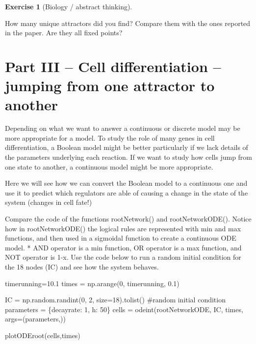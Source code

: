 \documentclass[
  letterpaper,
  DIV=11,
  numbers=noendperiod]{scrreprt}
\newenvironment{Shaded}{\begin{snugshade}}{\end{snugshade}}
\newcommand{\CommentTok}[1]{\textcolor[rgb]{0.37,0.37,0.37}{#1}}
\newcommand{\DecValTok}[1]{\textcolor[rgb]{0.68,0.00,0.00}{#1}}
\newcommand{\FloatTok}[1]{\textcolor[rgb]{0.68,0.00,0.00}{#1}}
\newcommand{\NormalTok}[1]{\textcolor[rgb]{0.00,0.23,0.31}{#1}}
\newcommand{\OperatorTok}[1]{\textcolor[rgb]{0.37,0.37,0.37}{#1}}
\newcommand{\StringTok}[1]{\textcolor[rgb]{0.13,0.47,0.30}{#1}}
\theoremstyle{definition}
\newtheorem{exercise}{Exercise}[chapter]
\theoremstyle{remark}
\begin{document}
\begin{exercise}[Biology / abstract
thinking]\protect\hypertarget{exr-non}{}\label{exr-non}

How many unique attractors did you find? Compare them with the ones
reported in the paper. Are they all fixed points?

\end{exercise}

\section{Part III -- Cell differentiation -- jumping from one attractor
to
another}\label{part-iii-cell-differentiation-jumping-from-one-attractor-to-another}

Depending on what we want to answer a continuous or discrete model may
be more appropriate for a model. To study the role of many genes in cell
differentiation, a Boolean model might be better particularly if we lack
details of the parameters underlying each reaction. If we want to study
how cells jump from one state to another, a continuous model might be
more appropriate.

Here we will see how we can convert the Boolean model to a continuous
one and use it to predict which regulators are able of causing a change
in the state of the system (changes in cell fate!)

Compare the code of the functions rootNetwork() and rootNetworkODE().
Notice how in rootNetworkODE() the logical rules are represented with
min and max functions, and then used in a sigmoidal function to create a
continuous ODE model. * AND operator is a min function, OR operator is a
max function, and NOT operator is 1-x. Use the code below to run a
random initial condition for the 18 nodes (IC) and see how the system
behaves.

\begin{Shaded}
\begin{Highlighting}[]
\NormalTok{timerunning}\OperatorTok{=}\FloatTok{10.1} 
\NormalTok{times }\OperatorTok{=}\NormalTok{ np.arange(}\DecValTok{0}\NormalTok{, timerunning, }\FloatTok{0.1}\NormalTok{)}

\NormalTok{IC }\OperatorTok{=}\NormalTok{ np.random.randint(}\DecValTok{0}\NormalTok{, }\DecValTok{2}\NormalTok{, size}\OperatorTok{=}\DecValTok{18}\NormalTok{).tolist() }\CommentTok{\#random initial condition}
\NormalTok{parameters }\OperatorTok{=}\NormalTok{ \{}\StringTok{\textquotesingle{}decayrate\textquotesingle{}}\NormalTok{: }\DecValTok{1}\NormalTok{, }\StringTok{\textquotesingle{}h\textquotesingle{}}\NormalTok{: }\DecValTok{50}\NormalTok{\} }
\NormalTok{cells }\OperatorTok{=}\NormalTok{ odeint(rootNetworkODE, IC, times, args}\OperatorTok{=}\NormalTok{(parameters,)) }

\NormalTok{plotODEroot(cells,times)}
\end{Highlighting}
\end{Shaded}
\end{document}
